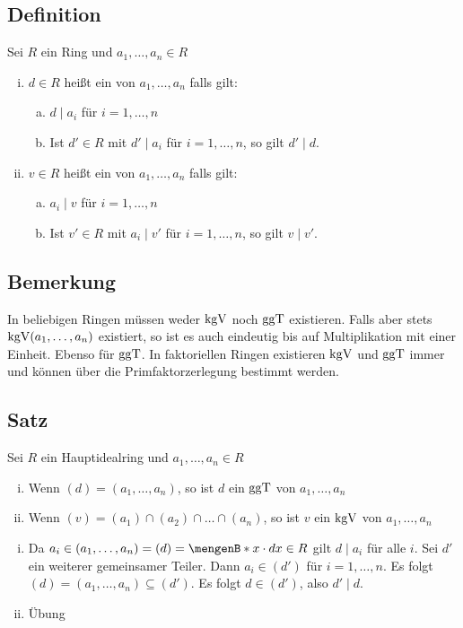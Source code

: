 \subsection[Definition: $\ggT$ und $\kgV$]{Definition} %
\label{sub:713}
Sei $R$ ein Ring und $a_1, \ldots , a_n \in R$
\begin{enumerate}[i)]
	\item $d \in R$ heißt ein  von $a_1, \ldots , a_n$ falls gilt:
	\begin{enumerate}[(a)]
		\item $d \mid a_i$ für $i=1,\ldots ,n$
		\item Ist $d' \in R$ mit $d' \mid a_i$ für $i=1,\ldots ,n$, so gilt $d' \mid d$.
	\end{enumerate} 
	\item $v \in R$ heißt ein  von $a_1, \ldots , a_n$ falls gilt:
	\begin{enumerate}[(a)]
		\item $a_i \mid v$ für $i=1, \ldots ,n$
		\item Ist $v' \in R$ mit $a_i \mid v'$ für $i=1,\ldots ,n$, so gilt $v \mid v'$.
	\end{enumerate} 
\end{enumerate}

\subsection[Bemerkung: Existenz von $\ggT$ und $\kgV$]{Bemerkung} %
\label{sub:714}
In beliebigen Ringen müssen weder $\kgV$ noch $\ggT$ existieren. Falls aber stets $\operatorname{kgV} (a_1, \ldots , a_n)$ existiert, so ist es auch eindeutig bis auf Multiplikation mit einer Einheit. Ebenso für $\ggT$.
In faktoriellen Ringen existieren $\kgV$ und $\ggT$ immer und können über die Primfaktorzerlegung bestimmt werden.

\subsection[Satz: Zusammenhang zwischen Idealen und $\ggT$ und $\kgV$]{Satz} %
\label{sub:715}
Sei $R$ ein Hauptidealring und $a_1,\ldots ,a_n \in R$
\begin{enumerate}[i)]
	\item Wenn $(d) = (a_1, \ldots ,a_n)$, so ist $d$ ein $\ggT$ von $a_1, \ldots ,a_n$
	\item Wenn $(v) = (a_1) \cap (a_2) \cap \ldots \cap (a_n)$, so ist $v$ ein $\kgV$ von $a_1, \ldots , a_n$
\end{enumerate}
\begin{enumerate}[i)]
	\item Da $a_i \in (a_1, \ldots ,a_n) = (d) =  \set[x \cdot d]{x \in R} $ gilt $d \mid a_i$ für alle $i$. Sei $d'$ ein weiterer gemeinsamer Teiler. Dann $a_i \in (d')$
	für $i=1,\ldots ,n$. Es folgt $(d) = (a_1, \ldots , a_n) \subseteq (d')$. Es folgt $d \in (d')$, also $d' \mid d$.
	\item Übung
\end{enumerate}

